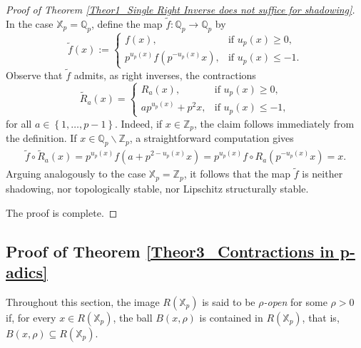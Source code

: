 \documentclass[a4paper, 12pt]{article}
\theoremstyle{definition}
\begin{document}
\begin{proof}[Proof of Theorem \ref{Theor1_Single Right Inverse does not suffice for shadowing}]
		In the case $\mathbb{X}_{p} = \mathbb{Q}_{p}$, define the map $\tilde{f}: \mathbb{Q}_{p} \to \mathbb{Q}_{p}$ by 
		$$ \tilde{f} \left(  x  \right)  :=   \begin{cases}
			f \left(  x  \right) , & \text{if } u_{p} \left(  x  \right)  \ge 0 ,  \\  
			p^{u_{p} \left(  x  \right) } f \left(  p^{-u_{p} \left(  x  \right) } x  \right) ,  & \text{if } u_{p} \left(  x  \right)  \le - 1 .  
		\end{cases}  $$
		Observe that $\tilde{f}$ admits, as right inverses, the contractions 
		$$ \tilde{R}_{a} \left(  x  \right)    =    \begin{cases} 
			R_{a} \left(  x  \right)  , & \text{if } u_{p} \left(  x  \right)  \ge 0,  \\  
			a  p^{u_{p} \left(  x  \right)  } + p^{2} x, & \text{if } u_{p} \left(  x  \right)  \le - 1, 
		\end{cases}
		$$
		for all $a \in  \left\{  1, \dots, p-1  \right\} $. Indeed, if $ x \in \mathbb{Z}_{p}$, the claim follows immediately from the definition. If $x \in \mathbb{Q}_{p} \backslash \mathbb{Z}_{p}$, a straightforward computation gives 
		\begin{align*}
			\tilde{f} \circ \tilde{R}_{a}  \left(  x  \right)    =    p^{u_{p} \left(  x  \right) } f \left(  a + p^{2 - u_{p} \left(  x  \right) } x  \right)    =   p^{u_{p} \left(  x  \right) } f \circ R_{a} \left(  p^{- u_{p} \left(  x \right) } x  \right)     =    x. 
		\end{align*}
		Arguing analogously to the case $\mathbb{X}_{p} = \mathbb{Z}_{p}$, it follows that the map $\tilde{f}$
		is neither shadowing, nor topologically stable, nor Lipschitz structurally stable.
		
		The proof is complete.
	\end{proof}
	
	
	
	
	
	
	
	
	
	
	
	
	\subsection{Proof of Theorem \ref{Theor3_Contractions in p-adics}}\label{Sec_Proof of Theorem Left Inverse}
	
	Throughout this section, the image $R \left(  \mathbb{X}_{p}  \right) $ is said to be \textit{$\rho$-open} for some $\rho  > 0$ if, for every $x \in R \left(  \mathbb{X}_{p}  \right) $, the ball $B \left(  x, \rho  \right) $ is contained in $R \left(  \mathbb{X}_{p}  \right) $, that is, $B \left(  x, \rho  \right)  \subseteq R \left(  \mathbb{X}_{p}  \right) $.  
	
\end{document}
